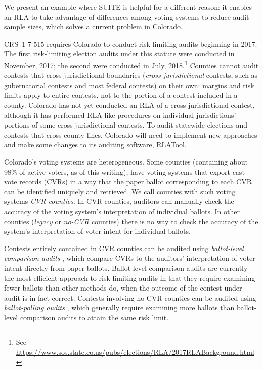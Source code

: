 \documentclass[runningheads]{llncs}
\begin{document}
We present an example where SUITE is helpful for a different reason: 
it enables an RLA to take
advantage of differences among voting systems to reduce audit sample sizes, which solves
a current problem in Colorado.

CRS~1-7-515 requires Colorado to conduct risk-limiting audits beginning in 2017.
The first risk-limiting election audits under this statute were conducted in November, 2017; the second were conducted in July, 2018.\footnote{%
 See \url{https://www.sos.state.co.us/pubs/elections/RLA/2017RLABackground.html}
}
Counties cannot audit contests that cross jurisdictional boundaries (\emph{cross-jurisdictional} contests, such as gubernatorial contests and most federal contests)
on their own: margins and risk limits apply to entire contests, not to the portion of a 
contest included in a county.
Colorado has not yet conducted an RLA of a cross-jurisdictional contest, although it has performed RLA-like procedures on individual jurisdictions' portions of some cross-jurisdictional contests.
To audit statewide elections and contests that cross county lines, Colorado will need to implement new approaches and make some changes to its auditing software, RLATool.

Colorado's voting systems are heterogeneous. 
Some counties (containing about 98\% of active voters, as of this writing), have 
voting systems that export cast vote records (CVRs) in a way that the paper ballot corresponding to each CVR can be identified uniquely and retrieved.
We call counties with such voting systems \emph{CVR counties}.
In CVR counties, auditors can manually check the accuracy of the voting system's interpretation of individual ballots.
In other counties (\emph{legacy} or \emph{no-CVR} counties) there is no way to check the accuracy
of the system's interpretation of voter intent for individual ballots.

Contests entirely contained in CVR counties can be audited using \emph{ballot-level comparison audits} \cite{lindemanStark12}, which compare CVRs to the auditors' interpretation of voter intent directly from paper ballots.
Ballot-level comparison audits are currently the most efficient approach to risk-limiting audits in that they require examining fewer ballots than other methods do, when the outcome of the contest under audit is in fact correct.
Contests involving no-CVR counties can be audited using \emph{ballot-polling audits} \cite{lindemanEtal12,lindemanStark12},  which generally require examining more ballots than ballot-level comparison audits to attain the same risk limit.
\end{document}
